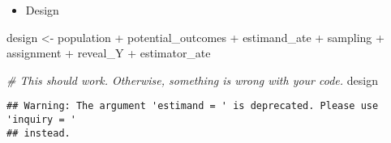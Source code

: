 \documentclass[
]{book}
\newenvironment{Shaded}{\begin{snugshade}}{\end{snugshade}}
\newcommand{\CommentTok}[1]{\textcolor[rgb]{0.56,0.35,0.01}{\textit{#1}}}
\newcommand{\NormalTok}[1]{#1}
\newcommand{\OtherTok}[1]{\textcolor[rgb]{0.56,0.35,0.01}{#1}}
\newcommand{\SpecialCharTok}[1]{\textcolor[rgb]{0.00,0.00,0.00}{#1}}
\providecommand{\tightlist}{%
  \setlength{\itemsep}{0pt}\setlength{\parskip}{0pt}}
\begin{document}
\begin{itemize}
\tightlist
\item
  Design
\end{itemize}

\begin{Shaded}
\begin{Highlighting}[]
\NormalTok{design }\OtherTok{\textless{}{-}}\NormalTok{ population }\SpecialCharTok{+}\NormalTok{ potential\_outcomes }\SpecialCharTok{+}\NormalTok{ estimand\_ate }\SpecialCharTok{+}\NormalTok{ sampling }\SpecialCharTok{+}\NormalTok{ assignment }\SpecialCharTok{+}\NormalTok{ reveal\_Y }\SpecialCharTok{+}\NormalTok{ estimator\_ate}

\CommentTok{\# This should work. Otherwise, something is wrong with your code.}
\NormalTok{design}
\end{Highlighting}
\end{Shaded}

\begin{verbatim}
## Warning: The argument 'estimand = ' is deprecated. Please use 'inquiry = '
## instead.
\end{verbatim}
\end{document}
